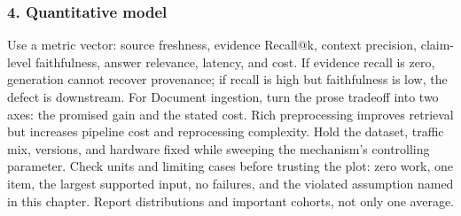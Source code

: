 \subsubsection*{4. Quantitative model}
Use a metric vector: source freshness, evidence Recall@k, context precision, claim-level faithfulness, answer relevance, latency, and cost. If evidence recall is zero, generation cannot recover provenance; if recall is high but faithfulness is low, the defect is downstream.
For Document ingestion, turn the prose tradeoff into two axes: the promised gain and the stated cost. Rich preprocessing improves retrieval but increases pipeline cost and reprocessing complexity. Hold the dataset, traffic mix, versions, and hardware fixed while sweeping the mechanism's controlling parameter.
Check units and limiting cases before trusting the plot: zero work, one item, the largest supported input, no failures, and the violated assumption named in this chapter. Report distributions and important cohorts, not only one average.
